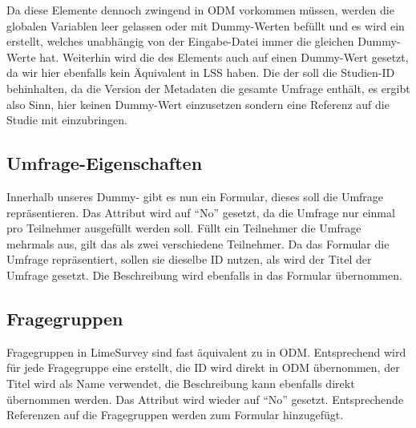 Da diese Elemente dennoch zwingend in ODM vorkommen müssen, werden die globalen Variablen leer gelassen oder mit Dummy-Werten befüllt und es wird ein  erstellt, welches unabhängig von der Eingabe-Datei immer die gleichen Dummy-Werte hat.
Weiterhin wird die  des  Elements auch auf einen Dummy-Wert gesetzt, da wir hier ebenfalls kein Äquivalent in LSS haben.
Die  der  soll die Studien-ID behinhalten, da die Version der Metadaten die gesamte Umfrage enthält, es ergibt also Sinn, hier keinen Dummy-Wert einzusetzen sondern eine Referenz auf die Studie mit einzubringen.

\subsection{Umfrage-Eigenschaften}
\label{m:survey_meta}

Innerhalb unseres Dummy- gibt es nun ein Formular, dieses soll die Umfrage repräsentieren.
Das  Attribut wird auf \enquote{No} gesetzt, da die Umfrage nur einmal pro Teilnehmer ausgefüllt werden soll.
Füllt ein Teilnehmer die Umfrage mehrmals aus, gilt das als zwei verschiedene Teilnehmer.
Da das Formular die Umfrage repräsentiert, sollen sie dieselbe ID nutzen, als  wird der Titel der Umfrage gesetzt. Die Beschreibung wird ebenfalls in das Formular übernommen.

\subsection{Fragegruppen}
\label{m:qg}
Fragegruppen in LimeSurvey sind fast äquivalent zu  in ODM.
Entsprechend wird für jede Fragegruppe eine  erstellt, die ID wird direkt in ODM übernommen, der Titel wird als Name verwendet, die Beschreibung kann ebenfalls direkt übernommen werden.
Das Attribut  wird wieder auf \enquote{No} gesetzt.
Entsprechende Referenzen auf die Fragegruppen werden zum Formular hinzugefügt.

